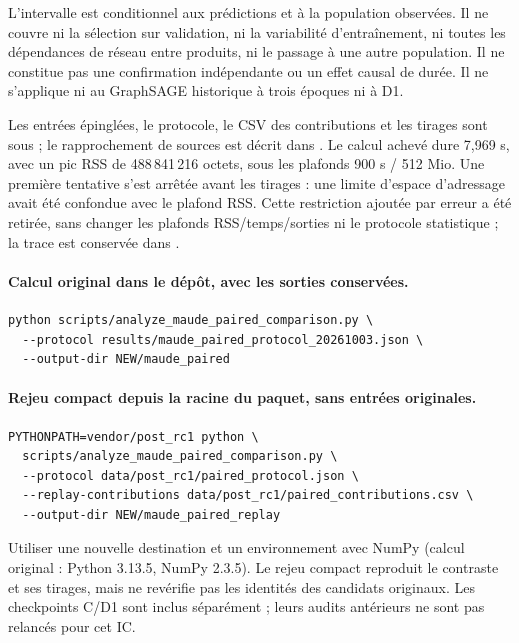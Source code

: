 L'intervalle est conditionnel aux prédictions et à la population observées. Il ne couvre ni la sélection sur validation, ni la variabilité d'entraînement, ni toutes les dépendances de réseau entre produits, ni le passage à une autre population. Il ne constitue pas une confirmation indépendante ou un effet causal de durée. Il ne s'applique ni au GraphSAGE historique à trois époques ni à D1.

Les entrées épinglées, le protocole, le CSV des contributions et les tirages sont sous ; le rapprochement de sources est décrit dans . Le calcul achevé dure 7,969 s, avec un pic RSS de 488\,841\,216 octets, sous les plafonds 900 s / 512 Mio. Une première tentative s'est arrêtée avant les tirages : une limite d'espace d'adressage avait été confondue avec le plafond RSS. Cette restriction ajoutée par erreur a été retirée, sans changer les plafonds RSS/temps/sorties ni le protocole statistique ; la trace est conservée dans .

\paragraph{Calcul original dans le dépôt, avec les sorties conservées.}
\begin{Verbatim}[fontsize=\footnotesize]
python scripts/analyze_maude_paired_comparison.py \
  --protocol results/maude_paired_protocol_20261003.json \
  --output-dir NEW/maude_paired
\end{Verbatim}

\paragraph{Rejeu compact depuis la racine du paquet, sans entrées originales.}
\begin{Verbatim}[fontsize=\footnotesize]
PYTHONPATH=vendor/post_rc1 python \
  scripts/analyze_maude_paired_comparison.py \
  --protocol data/post_rc1/paired_protocol.json \
  --replay-contributions data/post_rc1/paired_contributions.csv \
  --output-dir NEW/maude_paired_replay
\end{Verbatim}
Utiliser une nouvelle destination et un environnement avec NumPy (calcul original : Python 3.13.5, NumPy 2.3.5). Le rejeu compact reproduit le contraste et ses tirages, mais ne revérifie pas les identités des candidats originaux. Les checkpoints C/D1 sont inclus séparément ; leurs audits antérieurs ne sont pas relancés pour cet IC.


